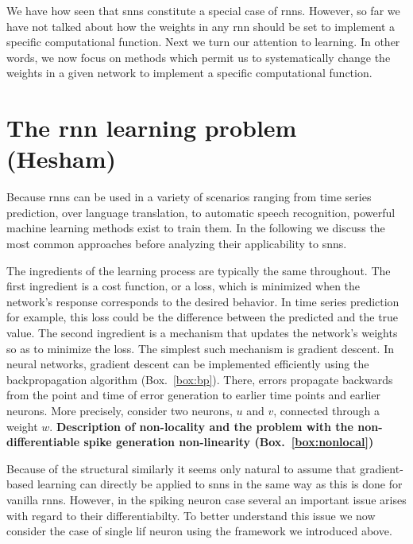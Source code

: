 \documentclass[journal,onecolumn,11pt]{IEEEtran}
\newcommand{\refbox}[1]{{\color{blue!70}(Box.~\ref{#1})}}
\begin{document}
We have how seen that \glspl{snn} constitute a special case of \glspl{rnn}.
However, so far we have not talked about how the weights in any \gls{rnn} should be set to implement a specific computational function.
Next we turn our attention to learning. 
In other words, we now focus on methods which permit us to systematically change the weights in a given network to implement a specific computational function.


\section{The \gls{rnn} learning problem (Hesham)}
Because \glspl{rnn} can be used in a variety of scenarios ranging from time series prediction, over language translation, to automatic speech recognition, powerful machine learning methods exist to train them. 
In the following we discuss the most common approaches before analyzing their applicability to \glspl{snn}.

The ingredients of the learning process are typically the same throughout.
The first ingredient is a cost function, or a loss, which is minimized when the network's response corresponds to the desired behavior.
In time series prediction for example, this loss could be the difference between the predicted and the true value.
The second ingredient is a mechanism that updates the network's weights so as to minimize the loss.
The simplest such mechanism is gradient descent.
In neural networks, gradient descent can be implemented efficiently using the backpropagation algorithm \refbox{box:bp}.
There, errors propagate backwards from the point and time of error generation to earlier time points and earlier neurons.
More precisely, consider two neurons, $u$ and $v$, connected through a weight $w$.
{\bf Description of non-locality and the problem with the non-differentiable spike generation non-linearity \refbox{box:nonlocal}}


Because of the structural similarly it seems only natural to assume that gradient-based learning can directly be applied to \glspl{snn} in the same way as this is done for vanilla \glspl{rnn}. 
However, in the spiking neuron case several an important issue arises
with regard to their differentiabilty.
To better understand this issue we now consider the case of single \gls{lif} neuron using the framework we introduced above.
\end{document}
